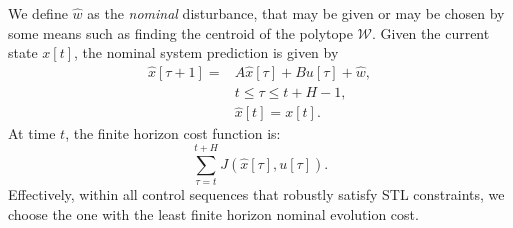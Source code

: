 \documentclass[letterpaper, 10 pt, conference]{ieeeconf}
\begin{document}
We define $\hat{w}$ as the \emph{nominal} disturbance, that may be given or may be chosen by some means such as finding the centroid of the polytope $\mathcal{W}$. Given the current state $x[t]$, the nominal system prediction is given by 
\begin{equation}
\label{eq:nominal}
\begin{split}
\hat{x}[\tau+1]=& A\hat{x}[\tau]+Bu[\tau]+\hat{w}, \\ & t \le \tau \le t+H-1, \\ & \hat{x}[t]=x[t].
\end{split}
\end{equation}
At time $t$, the finite horizon cost function is:
\begin{equation}
\sum \limits_{\tau=t}^{t+H} J(\hat{x}[\tau],u[\tau]).
\end{equation}
Effectively, within all control sequences that robustly satisfy STL constraints, we choose the one with the least finite horizon nominal evolution cost. 
\end{document}
